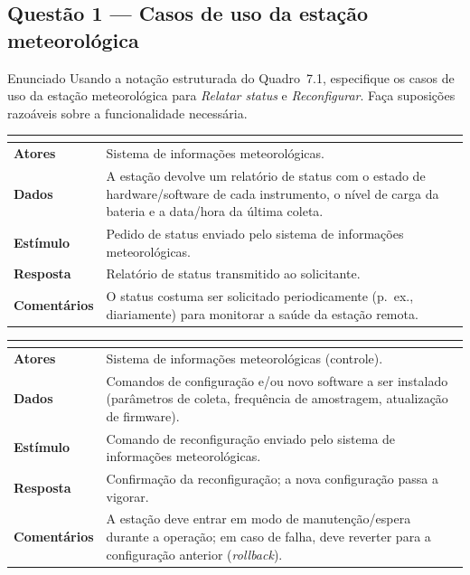 \documentclass[11pt,a4paper]{article}
\begin{document}
\subsection*{Questão 1 — Casos de uso da estação meteorológica}
\begin{questao}{Enunciado}
Usando a notação estruturada do Quadro~7.1, especifique os casos de uso da
estação meteorológica para \emph{Relatar status} e \emph{Reconfigurar}. Faça
suposições razoáveis sobre a funcionalidade necessária.
\end{questao}
\begin{resposta}
\begin{center}\small
\begin{tabular}{@{}>{\bfseries}p{3.2cm}p{11.2cm}@{}}
\toprule
\multicolumn{2}{@{}l}{\textbf{Sistema:} Estação meteorológica \quad\textbf{Caso de uso:} Relatar status}\\
\midrule
Atores & Sistema de informações meteorológicas. \\
Dados & A estação devolve um relatório de status com o estado de hardware/software de cada instrumento, o nível de carga da bateria e a data/hora da última coleta. \\
Estímulo & Pedido de status enviado pelo sistema de informações meteorológicas. \\
Resposta & Relatório de status transmitido ao solicitante. \\
Comentários & O status costuma ser solicitado periodicamente (p.\ ex., diariamente) para monitorar a saúde da estação remota. \\
\bottomrule
\end{tabular}
\end{center}

\begin{center}\small
\begin{tabular}{@{}>{\bfseries}p{3.2cm}p{11.2cm}@{}}
\toprule
\multicolumn{2}{@{}l}{\textbf{Sistema:} Estação meteorológica \quad\textbf{Caso de uso:} Reconfigurar}\\
\midrule
Atores & Sistema de informações meteorológicas (controle). \\
Dados & Comandos de configuração e/ou novo software a ser instalado (parâmetros de coleta, frequência de amostragem, atualização de firmware). \\
Estímulo & Comando de reconfiguração enviado pelo sistema de informações meteorológicas. \\
Resposta & Confirmação da reconfiguração; a nova configuração passa a vigorar. \\
Comentários & A estação deve entrar em modo de manutenção/espera durante a operação; em caso de falha, deve reverter para a configuração anterior (\emph{rollback}). \\
\bottomrule
\end{tabular}
\end{center}
\end{resposta}
\end{document}
